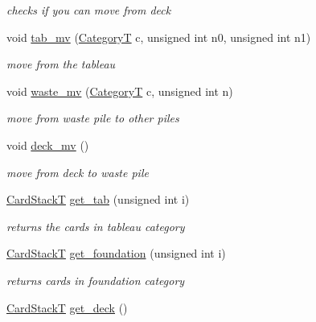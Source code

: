 \begin{DoxyCompactItemize}
\begin{DoxyCompactList}\small\item\em checks if you can move from deck \end{DoxyCompactList}\item 
void \hyperlink{class_board_t_a29748f9762362b5f7f12a5678d0c387d}{tab\+\_\+mv} (\hyperlink{_card_types_8h_aa77f81f8d4c8aa57046a50ca32d6b7b4}{CategoryT} c, unsigned int n0, unsigned int n1)
\begin{DoxyCompactList}\small\item\em move from the tableau \end{DoxyCompactList}\item 
void \hyperlink{class_board_t_a2656775270574758d508b3e6b026d711}{waste\+\_\+mv} (\hyperlink{_card_types_8h_aa77f81f8d4c8aa57046a50ca32d6b7b4}{CategoryT} c, unsigned int n)
\begin{DoxyCompactList}\small\item\em move from waste pile to other piles \end{DoxyCompactList}\item 
\mbox{\label{class_board_t_a548e3e518666a6f38b49e072a88a6d2c}} 
void \hyperlink{class_board_t_a548e3e518666a6f38b49e072a88a6d2c}{deck\+\_\+mv} ()
\begin{DoxyCompactList}\small\item\em move from deck to waste pile \end{DoxyCompactList}\item 
\hyperlink{_card_stack_8h_a29a6854caf5fec306ee8fc0c6b453837}{Card\+StackT} \hyperlink{class_board_t_a8435d5e5538d9d7fc4f335063183694a}{get\+\_\+tab} (unsigned int i)
\begin{DoxyCompactList}\small\item\em returns the cards in tableau category \end{DoxyCompactList}\item 
\hyperlink{_card_stack_8h_a29a6854caf5fec306ee8fc0c6b453837}{Card\+StackT} \hyperlink{class_board_t_acc73c4130747c4848e757bc643927160}{get\+\_\+foundation} (unsigned int i)
\begin{DoxyCompactList}\small\item\em returns cards in foundation category \end{DoxyCompactList}\item 
\hyperlink{_card_stack_8h_a29a6854caf5fec306ee8fc0c6b453837}{Card\+StackT} \hyperlink{class_board_t_a2f28e0a5e9c34f396e2aebc79342a225}{get\+\_\+deck} ()

\end{DoxyCompactItemize}
